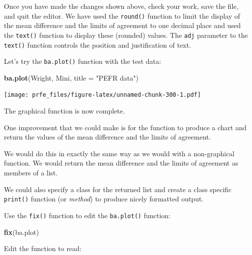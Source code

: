\documentclass[12pt,a4paper]{book}
\newenvironment{Shaded}{\begin{snugshade}}{\end{snugshade}}
\newcommand{\KeywordTok}[1]{\textcolor[rgb]{0.13,0.29,0.53}{\textbf{#1}}}
\newcommand{\DataTypeTok}[1]{\textcolor[rgb]{0.13,0.29,0.53}{#1}}
\newcommand{\StringTok}[1]{\textcolor[rgb]{0.31,0.60,0.02}{#1}}
\newcommand{\NormalTok}[1]{#1}
\theoremstyle{definition}
\theoremstyle{definition}
\theoremstyle{definition}
\theoremstyle{remark}
\begin{document}
Once you have made the changes shown above, check your work, save the
file, and quit the editor. We have used the \texttt{round()} function to
limit the display of the mean difference and the limits of agreement to
one decimal place and used the \texttt{text()} function to display these
(rounded) values. The \texttt{adj} parameter to the \texttt{text()}
function controls the position and justification of text.

Let's try the \texttt{ba.plot()} function with the test data:

\begin{Shaded}
\begin{Highlighting}[]
\KeywordTok{ba.plot}\NormalTok{(Wright, Mini, }\DataTypeTok{title =} \StringTok{"PEFR data"}\NormalTok{)}
\end{Highlighting}
\end{Shaded}

\texttt{[image: prfe\_files/figure-latex/unnamed-chunk-300-1.pdf]}

The graphical function is now complete.

One improvement that we could make is for the function to produce a
chart and return the values of the mean difference and the limits of
agreement.

We would do this in exactly the same way as we would with a
non-graphical function. We would return the mean difference and the
limits of agreement as members of a list.

We could also specify a class for the returned list and create a class
specific \texttt{print()} function (or \emph{method}) to produce nicely
formatted output.

Use the \texttt{fix()} function to edit the \texttt{ba.plot()} function:

\begin{Shaded}
\begin{Highlighting}[]
\KeywordTok{fix}\NormalTok{(ba.plot)}
\end{Highlighting}
\end{Shaded}

Edit the function to read:
\end{document}

